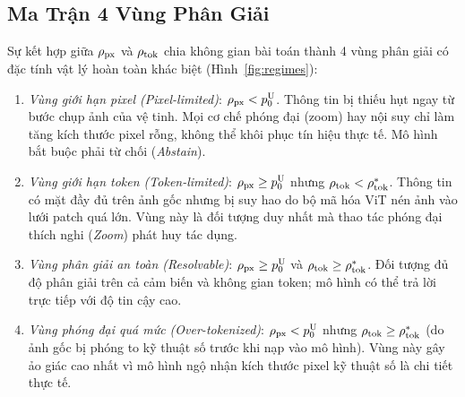 \begin{table}[t]
\centering
\caption{Bộ mã hóa thị giác, patch hiệu dụng $P$ và chính sách phân giải của 5 mô hình RS-MLLM trong nghiên cứu.}
\label{tab:models_arch}
\end{table}

\subsection{Ma Trận 4 Vùng Phân Giải}
Sự kết hợp giữa $\rho_{\mathrm{px}}$ và $\rho_{\mathrm{tok}}$ chia không gian bài toán thành 4 vùng phân giải có đặc tính vật lý hoàn toàn khác biệt (Hình~\ref{fig:regimes}):
\begin{enumerate}
    \item \textit{Vùng giới hạn pixel (Pixel-limited)}: $\rho_{\mathrm{px}} < p_0^{\mathrm{U}}$. Thông tin bị thiếu hụt ngay từ bước chụp ảnh của vệ tinh. Mọi cơ chế phóng đại (zoom) hay nội suy chỉ làm tăng kích thước pixel rỗng, không thể khôi phục tín hiệu thực tế. Mô hình bắt buộc phải từ chối (\textit{Abstain}).
    \item \textit{Vùng giới hạn token (Token-limited)}: $\rho_{\mathrm{px}} \ge p_0^{\mathrm{U}}$ nhưng $\rho_{\mathrm{tok}} < \rho_{\mathrm{tok}}^*$. Thông tin có mặt đầy đủ trên ảnh gốc nhưng bị suy hao do bộ mã hóa ViT nén ảnh vào lưới patch quá lớn. Vùng này là đối tượng duy nhất mà thao tác phóng đại thích nghi (\textit{Zoom}) phát huy tác dụng.
    \item \textit{Vùng phân giải an toàn (Resolvable)}: $\rho_{\mathrm{px}} \ge p_0^{\mathrm{U}}$ và $\rho_{\mathrm{tok}} \ge \rho_{\mathrm{tok}}^*$. Đối tượng đủ độ phân giải trên cả cảm biến và không gian token; mô hình có thể trả lời trực tiếp với độ tin cậy cao.
    \item \textit{Vùng phóng đại quá mức (Over-tokenized)}: $\rho_{\mathrm{px}} < p_0^{\mathrm{U}}$ nhưng $\rho_{\mathrm{tok}} \ge \rho_{\mathrm{tok}}^*$ (do ảnh gốc bị phóng to kỹ thuật số trước khi nạp vào mô hình). Vùng này gây ảo giác cao nhất vì mô hình ngộ nhận kích thước pixel kỹ thuật số là chi tiết thực tế.
\end{enumerate}

